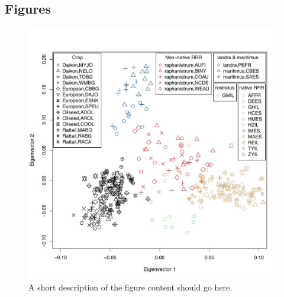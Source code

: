 \documentclass[twocolumn]{bmcart}%
\begin{document}
\begin{backmatter}


\onecolumn

\section*{Figures}


\begin{figure}[p]
  \includegraphics[width=\linewidth]{Figures/SmartPCA.pdf}
  \caption{
      A short description of the figure content
      should go here.}
      \end{figure}


\end{backmatter}
\end{document}
